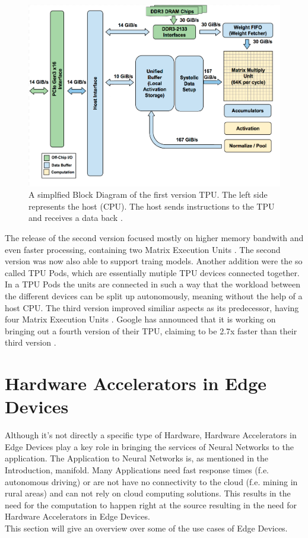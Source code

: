 \documentclass[conference]{IEEEtran}
\begin{document}
\begin{figure}[h]
	\caption{A simplfied Block Diagram of the first version TPU. The left side represents the host (CPU). The host sends instructions to the TPU and receives a data back \cite{jouppi2017datacenter}.}
	\centering
	\includegraphics[width=\linewidth]{pictures/tpu_floorplan.png}
\end{figure}
The release of the second version focused mostly on higher memory bandwith and even faster processing, containing two Matrix Execution Units \cite{secondversiontpu}. The second version was now also able to support traing models. Another addition were the so called TPU Pods, which are essentially mutiple TPU devices connected together. In a TPU Pods the units are connected in such a way that the workload between the different devices can be split up autonomously, meaning without the help of a host CPU.
The third version improved similiar aspects as its predecessor, having four Matrix Execution Units \cite{thirdversiontpu}. Google has announced that it is working on bringing out a fourth version of their TPU, claiming to be 2.7x faster than their third version \cite{fourthversiontpu}.
\newpage

\section{Hardware Accelerators in Edge Devices}
Although it's not directly a specific type of Hardware, Hardware Accelerators in Edge Devices play a key role in bringing the services of Neural Networks to the application. The Application to Neural Networks is, as mentioned in the Introduction, manifold. Many Applications need fast response times (f.e. autonomous driving) or are not have no connectivity to the cloud (f.e. mining in rural areas) and can not rely on cloud computing solutions. This results in the need for the computation to happen right at the source resulting in the need for Hardware Accelerators in Edge Devices.
\\
This section will give an overview over some of the use cases of Edge Devices.
\end{document}
